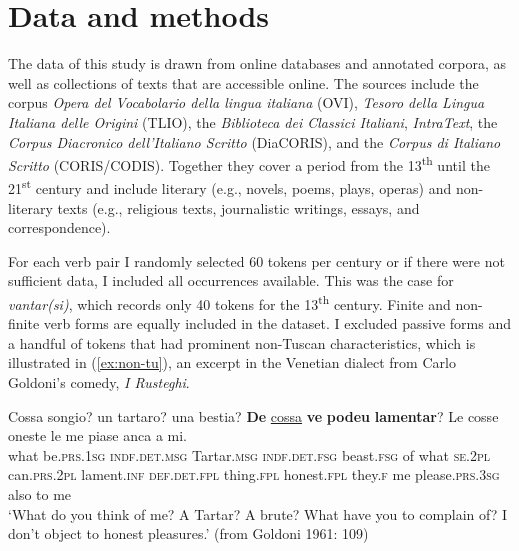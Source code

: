 \documentclass[output=paper,colorlinks,citecolor=brown]{langscibook}
\begin{document}
\section{Data and methods} \label{methods}

The data of this study is drawn from online databases and annotated corpora, as well as collections of texts that are accessible online. The sources include the corpus \textit{Opera del Vocabolario della lingua italiana} (OVI), \textit{Tesoro della Lingua Italiana delle Origini} (TLIO), the \textit{Biblioteca dei Classici Italiani}, \textit{IntraText}, the \textit{Corpus Diacronico dell’Italiano Scritto} (DiaCORIS), and the \textit{Corpus di Italiano Scritto} (CORIS/CODIS). Together they cover a period from the 13\textsuperscript{th} until the 21\textsuperscript{st} century and include literary (e.g., novels, poems, plays, operas) and non-literary texts (e.g., religious texts, journalistic writings, essays, and correspondence).

For each verb pair I randomly selected 60 tokens per century or if there were not sufficient data, I included all occurrences available. This was the case for \textit{vantar(si)}, which records only 40 tokens for the 13\textsuperscript{th} century. Finite and non-finite verb forms are equally included in the dataset. I excluded passive forms and a handful of tokens that had prominent non-Tuscan characteristics, which is illustrated in (\ref{ex:non-tu}), an excerpt in the Venetian dialect from Carlo Goldoni's comedy, \textit{I Rusteghi}.

\begin{exe}
\ex \label{ex:non-tu}
    \gll Cossa songio? un tartaro? una bestia? \textbf{De} \ul{cossa} \textbf{ve} \textbf{podeu} \textbf{lamentar}? Le cosse oneste le me piase anca a mi.\\
    what be.\textsc{prs.1sg} \textsc{indf.det.msg} Tartar.\textsc{msg} \textsc{indf.det.fsg} beast.\textsc{fsg} of what \textsc{se}.\textsc{2pl} can.\textsc{prs.2pl} lament.\textsc{inf} \textsc{def.det.fpl} thing.\textsc{fpl} honest.\textsc{fpl} they.\textsc{f} me please.\textsc{prs.3sg} also to me\\  
    \glt ‘What do you think of me? A Tartar? A brute? What have you to complain of? I don’t object to honest pleasures.’ (from Goldoni 1961: 109)
\end{exe}
\end{document}
